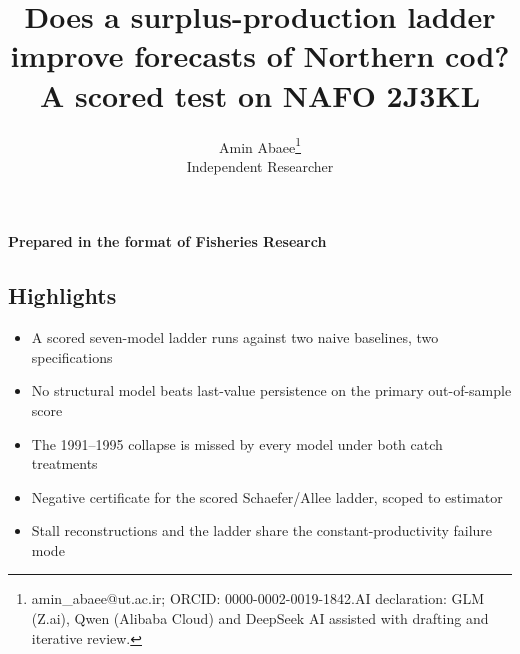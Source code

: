 \documentclass[11pt]{article}
\providecommand{\tightlist}{\setlength{\itemsep}{0pt}\setlength{\parskip}{0pt}}
\begin{document}
\title{Does a surplus-production ladder improve forecasts of Northern cod? A scored test on NAFO 2J3KL}
\author{Amin Abaee\thanks{amin\_abaee@ut.ac.ir; ORCID: 0000-0002-0019-1842.\newline AI declaration: GLM (Z.ai), Qwen (Alibaba Cloud) and DeepSeek AI assisted with drafting and iterative review.} \\ Independent Researcher}
\date{}
\maketitle

{\centering\small \textbf{Prepared in the format of Fisheries Research}\par}

\subsection{Highlights}\label{highlights}

\begin{itemize}
\tightlist
\item
  A scored seven-model ladder runs against two naive baselines, two
  specifications
\item
  No structural model beats last-value persistence on the primary
  out-of-sample score
\item
  The 1991--1995 collapse is missed by every model under both catch
  treatments
\item
  Negative certificate for the scored Schaefer/Allee ladder, scoped to
  estimator
\item
  Stall reconstructions and the ladder share the constant-productivity
  failure mode
\end{itemize}
\end{document}
